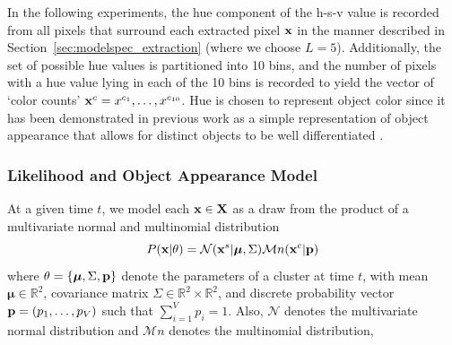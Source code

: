 \documentclass[smallcondensed, final]{svjour3}
\begin{document}
In the following experiments, the hue component of the h-s-v value is recorded from all pixels that surround each extracted pixel $\bold{x}$ in the manner described in Section~\ref{sec:modelspec_extraction} (where we choose $L=5$). Additionally, the set of possible hue values is partitioned into 10 bins, and the number of pixels with a hue value lying in each of the 10 bins is recorded to yield the vector of `color counts' $\bold{x}^{c} = x^{c_{1}}, \ldots, x^{c_{10}}$. Hue is chosen to represent object color since it has been demonstrated in previous work as a simple representation of object appearance that allows for distinct objects to be well differentiated \cite{perez_2002, raja_1998, mckenna_1999}.






\subsubsection{Likelihood and Object Appearance Model}

At a given time $t$, we model each $\bold{x} \in \bold{X}$ as a draw from the product of a multivariate normal and multinomial distribution
\begin{equation}
\label{likelihood}
P(\bold{x}|\theta) = \mathcal{N}(\bold{x}^{s} | \boldsymbol{\mu}, \Sigma)  \mathcal{M}n(\bold{x}^{c} | \bold{p})
\end{equation}
where $\theta = \{ \boldsymbol{\mu}, \Sigma, \bold{p} \}$ denote the parameters of a cluster at time $t$, with mean $\boldsymbol{\mu} \in \mathbb{R}^{2}$, covariance matrix $\Sigma \in \mathbb{R}^{2} \times \mathbb{R}^{2}$, and discrete probability vector $\bold{p} = (p_{1}, \ldots, p_{V})$ such that $\sum_{i=1}^{V}p_{i} = 1$. Also, $\mathcal{N}$ denotes the multivariate normal distribution and $\mathcal{M}n$ denotes the multinomial distribution, 
\end{document}
